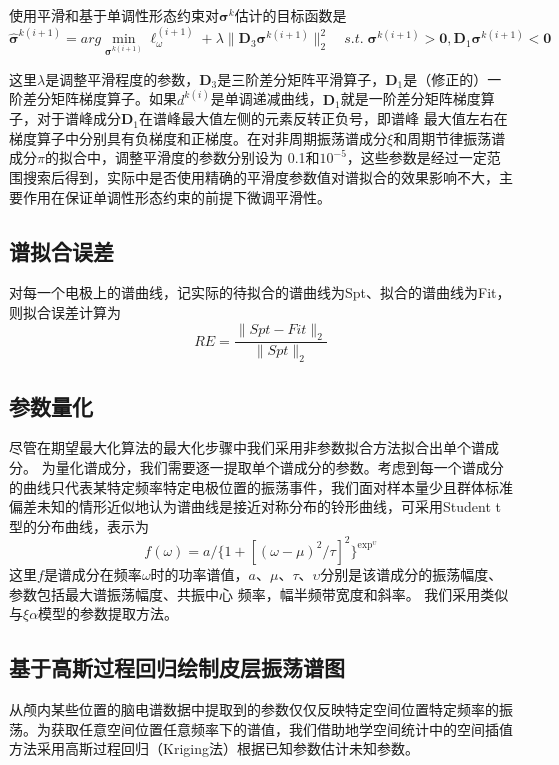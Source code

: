 使用平滑和基于单调性形态约束对$\mathbf{\sigma}^k$估计的目标函数是
\begin{equation}\label{eq7.12}
\hat{\mathbf{\sigma}}^{k(i+1)}=arg\min_{\mathbf{\sigma}^{k(i+1)}}\ell_\omega^{(i+1)}+\lambda\lVert\mathbf{D}_3\mathbf{\sigma}^{k(i+1)}\rVert_2^2\quad
s.t.\;\mathbf{\sigma}^{k(i+1)}>\mathbf{0},\mathbf{D}_1\mathbf{\sigma}^{k(i+1)}<\mathbf{0}
\end{equation}

这里$\lambda$是调整平滑程度的参数，$\mathbf{D}_3$是三阶差分矩阵平滑算子，$\mathbf{D}_1$是（修正的）一阶差分矩阵梯度算子。如果$d^{k(i)}$是单调递减曲线，$\mathbf{D}_1$就是一阶差分矩阵梯度算子，对于谱峰成分$\mathbf{D}_1$在谱峰最大值左侧的元素反转正负号，即谱峰
最大值左右在梯度算子中分别具有负梯度和正梯度。在对非周期振荡谱成分$\xi$和周期节律振荡谱成分$\pi$的拟合中，调整平滑度的参数分别设为
0.1和$10^{-5}$，这些参数是经过一定范围搜索后得到，实际中是否使用精确的平滑度参数值对谱拟合的效果影响不大，主要作用在保证单调性形态约束的前提下微调平滑性。

\subsection{谱拟合误差}
对每一个电极上的谱曲线，记实际的待拟合的谱曲线为Spt、拟合的谱曲线为Fit，则拟合误差计算为
\begin{equation}\label{eq7.13}
RE = \frac{\lVert{Spt-Fit}\rVert_2}{\lVert{Spt}\rVert_2}
\end{equation}

\subsection{参数量化}
尽管在期望最大化算法的最大化步骤中我们采用非参数拟合方法拟合出单个谱成分。 为量化谱成分，我们需要逐一提取单个谱成分的参数。考虑到每一个谱成分的曲线只代表某特定频率特定电极位置的振荡事件，我们面对样本量少且群体标准偏差未知的情形近似地认为谱曲线是接近对称分布的铃形曲线，可采用Student t型的分布曲线，表示为
\begin{equation}\label{eq7.14}
f(\omega)=a/\lbrace1+[(\omega-\mu)^2/\tau]^2\rbrace^{\exp^\upsilon}
\end{equation}
这里$f$是谱成分在频率$\omega$时的功率谱值，$a$、$\mu$、$\tau$、$\upsilon$分别是该谱成分的振荡幅度、参数包括最大谱振荡幅度、共振中心
频率，幅半频带宽度和斜率。 我们采用类似与$\xi\alpha$模型的参数提取方法。

\subsection{基于高斯过程回归绘制皮层振荡谱图}\label{ch:kriging}
从颅内某些位置的脑电谱数据中提取到的参数仅仅反映特定空间位置特定频率的振荡。为获取任意空间位置任意频率下的谱值，我们借助地学空间统计中的空间插值方法采用高斯过程回归（Kriging法）根据已知参数估计未知参数。

